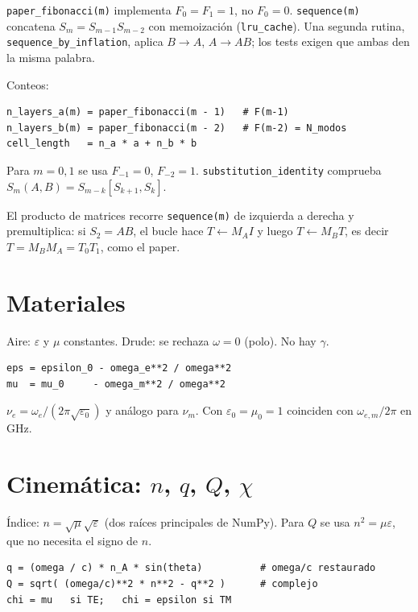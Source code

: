 \documentclass[11pt,a4paper]{article}
\begin{document}
\texttt{paper\_fibonacci(m)} implementa \(F_0=F_1=1\), no \(F_0=0\).
\texttt{sequence(m)} concatena \(S_m=S_{m-1}S_{m-2}\) con memoización
(\texttt{lru\_cache}).
Una segunda rutina, \texttt{sequence\_by\_inflation}, aplica \(B\to A\),
\(A\to AB\); los tests exigen que ambas den la misma palabra.

Conteos:

\begin{lstlisting}[style=tiny]
n_layers_a(m) = paper_fibonacci(m - 1)   # F(m-1)
n_layers_b(m) = paper_fibonacci(m - 2)   # F(m-2) = N_modos
cell_length   = n_a * a + n_b * b
\end{lstlisting}

Para \(m=0,1\) se usa \(F_{-1}=0\), \(F_{-2}=1\).
\texttt{substitution\_identity} comprueba
\(S_m(A,B)=S_{m-k}[S_{k+1},S_k]\).

El producto de matrices recorre \texttt{sequence(m)} de izquierda a derecha
y premultiplica: si \(S_2=AB\), el bucle hace \(T\leftarrow M_A I\) y luego
\(T\leftarrow M_B T\), es decir \(T=M_B M_A=T_0 T_1\), como el paper.

\section{Materiales}

Aire: \(\varepsilon\) y \(\mu\) constantes.
Drude: se rechaza \(\omega=0\) (polo). No hay \(\gamma\).

\begin{lstlisting}[style=tiny]
eps = epsilon_0 - omega_e**2 / omega**2
mu  = mu_0     - omega_m**2 / omega**2
\end{lstlisting}

\(\nu_e=\omega_e/(2\pi\sqrt{\varepsilon_0})\) y análogo para \(\nu_m\).
Con \(\varepsilon_0=\mu_0=1\) coinciden con \(\omega_{e,m}/2\pi\) en GHz.

\section{Cinemática: \(n\), \(q\), \(Q\), \(\chi\)}

Índice: \(n=\sqrt{\mu}\sqrt{\varepsilon}\) (dos raíces principales de NumPy).
Para \(Q\) se usa \(n^2=\mu\varepsilon\), que no necesita el signo de \(n\).

\begin{lstlisting}[style=tiny]
q = (omega / c) * n_A * sin(theta)          # omega/c restaurado
Q = sqrt( (omega/c)**2 * n**2 - q**2 )      # complejo
chi = mu   si TE;   chi = epsilon si TM
\end{lstlisting}
\end{document}
